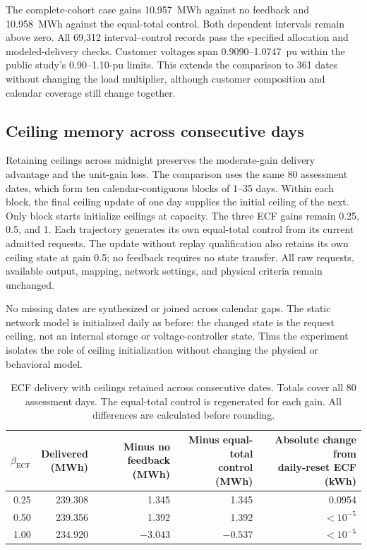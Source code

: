 \documentclass[11pt]{article}
\begin{document}
The complete-cohort case gains 10.957~MWh against no feedback and
10.958~MWh against the equal-total control. Both dependent intervals remain
above zero. All 69,312 interval--control records pass the specified allocation
and modeled-delivery checks. Customer voltages span 0.9090--1.0747~pu within
the public study's 0.90--1.10-pu limits. This extends the comparison to 361 dates without changing
the load multiplier, although customer composition and calendar coverage still
change together.

\subsection{Ceiling memory across consecutive days}
\label{supp:contiguous_state}

Retaining ceilings across midnight preserves the moderate-gain delivery
advantage and the unit-gain loss. The comparison uses the same 80 assessment
dates, which form ten calendar-contiguous blocks of 1--35 days. Within each
block, the final ceiling update of one day supplies the initial ceiling of
the next. Only block starts initialize ceilings at capacity. The three ECF
gains remain 0.25, 0.5, and 1. Each trajectory generates its own equal-total
control from its current admitted requests. The update without replay
qualification also retains its own ceiling state at gain 0.5; no feedback
requires no state transfer. All raw requests, available output, mapping,
network settings, and physical criteria remain unchanged.

No missing dates are synthesized or joined across calendar gaps.
The static network model is initialized daily
as before: the changed state is the request ceiling, not an internal storage
or voltage-controller state. Thus the experiment isolates the role of ceiling
initialization without changing the physical or behavioral model.

\begin{table}[!ht]
\centering
\caption{ECF delivery with ceilings retained across consecutive dates.
Totals cover all 80 assessment days. The equal-total control is regenerated
for each gain. All differences are calculated before rounding.}
\label{tab:supp_contiguous_totals}
\vspace{3pt}
\small
\begin{tabular}{@{}rrrrr@{}}
\toprule
$\beta_{\mathrm{ECF}}$ & \shortstack{Delivered\\(MWh)} &
\shortstack{Minus no\\feedback (MWh)} &
\shortstack{Minus equal-total\\control (MWh)} &
\shortstack{Absolute change from\\daily-reset ECF (kWh)} \\
\midrule
0.25 & 239.308 & 1.345 & 1.345 & 0.0954 \\
0.50 & 239.356 & 1.392 & 1.392 & $<10^{-5}$ \\
1.00 & 234.920 & $-3.043$ & $-0.537$ & $<10^{-5}$ \\
\bottomrule
\end{tabular}
\end{table}
\end{document}
